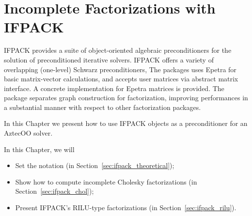 % 
% 
% 
%  
%  
% 

\section{Incomplete Factorizations with IFPACK}
\label{chap:ifpack}

IFPACK provides a suite of object-oriented algebraic preconditioners for
the solution of preconditioned iterative solvers. IFPACK offers a
variety of overlapping (one-level) Schwarz preconditioners, The packages
uses Epetra for basic matrix-vector calculations, and accepts user
matrices via abstract matrix interface. A concrete implementation for
Epetra matrices is provided. The package separates graph construction
for factorization, improving performances in a substantial manner with
respect to other factorization packages.

In this Chapter we present how to use IFPACK objects as a preconditioner
for an AztecOO solver. 

In this Chapter, we will
\begin{itemize}
\item Set the notation (in Section~\ref{sec:ifpack_theoretical});
\item Show how to compute incomplete Cholesky factorizations (in
  Section~\ref{sec:ifpack_chol});
\item Present IFPACK's RILU-type factorizations (in
  Section~\ref{sec:ifpack_rilu}).
\end{itemize}

